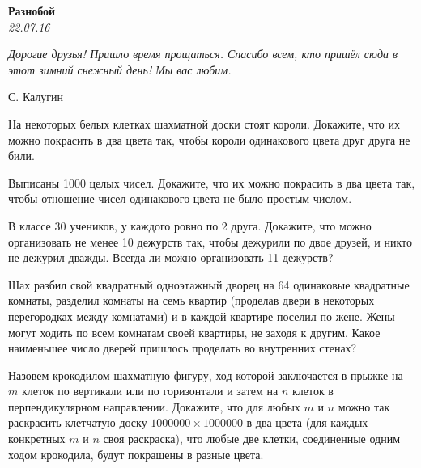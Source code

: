 \begin{center}
\textbf{\Large Разнобой}\\
\textit{22.07.16}
\end{center}

\epigraph{\it Дорогие друзья! Пришло время прощаться. Спасибо всем, кто пришёл сюда в этот зимний снежный день! Мы вас любим.}{С. Калугин}

\begin{problems}
\item На некоторых белых клетках шахматной доски стоят короли. Докажите, что их можно покрасить в два цвета так, чтобы короли одинакового цвета друг друга не били.

\item Выписаны 1000 целых чисел. Докажите, что их можно покрасить в два цвета так, чтобы отношение чисел одинакового цвета не было простым числом. 

\item В классе 30 учеников, у каждого ровно по 2 друга. Докажите, что можно организовать не менее 10 дежурств так, чтобы дежурили по двое друзей, и никто не дежурил дважды. Всегда ли можно организовать 11 дежурств?

\item Шах разбил свой квадратный одноэтажный дворец на 64 одинаковые квадратные комнаты, разделил комнаты на семь квартир (проделав двери в некоторых перегородках между комнатами) и в каждой квартире поселил по жене. Жены могут ходить по всем комнатам своей квартиры, не заходя к другим. Какое наименьшее число дверей пришлось проделать во внутренних стенах?

\item Назовем крокодилом шахматную фигуру, ход которой заключается в прыжке на $m$ клеток по вертикали или по горизонтали и затем на $n$ клеток в перпендикулярном направлении. Докажите, что для любых $m$ и $n$ можно так раскрасить клетчатую доску $1000000\times 1000000$ в два цвета (для каждых конкретных $m$ и $n$ своя раскраска), что любые две клетки, соединенные одним ходом крокодила, будут покрашены в разные цвета.



\end{problems}
